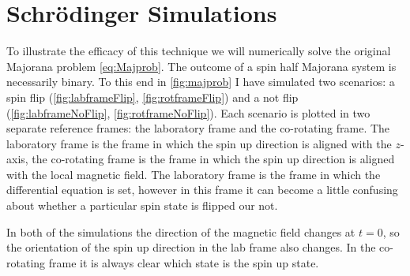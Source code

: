 
\section{Schr\"odinger Simulations}

To illustrate the efficacy of this technique we will numerically solve the original Majorana problem \autoref{eq:Majprob}.
The outcome of a spin half Majorana system is necessarily binary.
To this end in \autoref{fig:majprob} I have simulated two scenarios: a spin flip (\autoref{fig:labframeFlip}, \autoref{fig:rotframeFlip}) and a not flip (\autoref{fig:labframeNoFlip}, \autoref{fig:rotframeNoFlip}).
Each scenario is plotted in two separate reference frames: the laboratory frame and the co-rotating frame.
The laboratory frame is the frame in which the spin up direction is aligned with the $z$-axis, the co-rotating frame is the frame in which the spin up direction is aligned with the local magnetic field.
The laboratory frame is the frame in which the differential equation is set, however in this frame it can become a little confusing about whether a particular spin state is flipped our not.

In both of the simulations the direction of the magnetic field changes at $t=0$, so the orientation of the spin up direction in the lab frame also changes.
In the co-rotating frame it is always clear which state is the spin up state.

